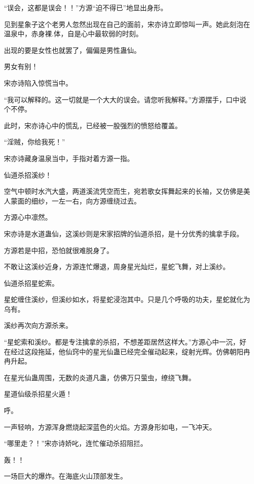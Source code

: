 
\begin{this_body}

“误会，这都是误会！！”方源“迫不得已”地显出身形。

见到星象子这个老男人忽然出现在自己的面前，宋亦诗立即惊叫一声。她此刻泡在温泉中，赤身裸.体，自是心中最软弱的时刻。

出现的要是女性也就罢了，偏偏是男性蛊仙。

男女有别！

宋亦诗陷入惊慌当中。

“我可以解释的。这一切就是一个大大的误会。请您听我解释。”方源摆手，口中说个不停。

此时，宋亦诗心中的慌乱，已经被一股强烈的愤怒给覆盖。

“淫贼，你给我死！”

宋亦诗藏身温泉当中，手指对着方源一指。

仙道杀招溪纱！

空气中顿时水汽大盛，两道溪流凭空而生，宛若歌女挥舞起来的长袖，又仿佛是美人蒙面的细纱，一左一右，向方源缠绕过去。

方源心中凛然。

宋亦诗是水道蛊仙，这溪纱则是宋家招牌的仙道杀招，是十分优秀的擒拿手段。

方源若是中招，恐怕就很难脱身了。

不敢让这溪纱近身，方源连忙爆退，周身星光灿烂，星蛇飞舞，对上溪纱。

仙道杀招星蛇索。

星蛇缠住溪纱，但溪纱如水，将星蛇浸泡其中。只是几个呼吸的功夫，星蛇就化为乌有。

溪纱再次向方源杀来。

“星蛇索和溪纱。都是专注擒拿的杀招，不想差距居然这样大。”方源心中一沉，好在经过这段拖延，他仙窍中的星光仙蛊已经完全催动起来，绽射光辉。仿佛朝阳冉冉升起。

在星光仙蛊周围，无数的炎道凡蛊，仿佛万只萤虫，缭绕飞舞。

星道仙级杀招星火遁！

呼。

一声轻响，方源浑身燃烧起深蓝色的火焰。方源身形如电，一飞冲天。

“哪里走？！”宋亦诗娇叱，连忙催动杀招阻拦。

轰！！

一场巨大的爆炸。在海底火山顶部发生。


\end{this_body}
